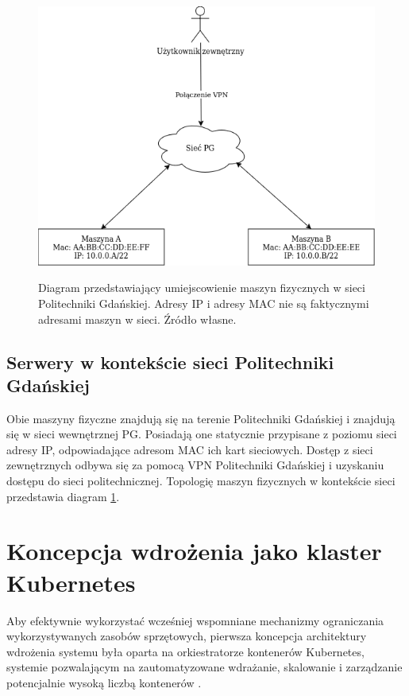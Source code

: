 \begin{figure}[!h]
	\begin{center}
		\resizebox{0.7\textwidth}{!} {
			\includegraphics{img/4/fizycznaSiec.png}
		}
		\caption[Diagram fizycznego rozmieszczenia maszyn w sieci Politechniki Gdańskiej]{Diagram przedstawiający umiejscowienie maszyn fizycznych w sieci Politechniki Gdańskiej. Adresy IP i adresy MAC nie są faktycznymi adresami maszyn w sieci. Źródło własne.}
		\label{diagramSiecFizyczna}
	\end{center}
\end{figure}

\subsection{Serwery w kontekście sieci Politechniki Gdańskiej}
Obie maszyny fizyczne znajdują się na terenie Politechniki Gdańskiej i znajdują się w sieci wewnętrznej PG. Posiadają one statycznie przypisane z poziomu sieci adresy IP, odpowiadające adresom MAC ich kart sieciowych. Dostęp z sieci zewnętrznych odbywa się za pomocą VPN Politechniki Gdańskiej i uzyskaniu dostępu do sieci politechnicznej. Topologię maszyn fizycznych w kontekście sieci przedstawia diagram \ref{diagramSiecFizyczna}.



\section{Koncepcja wdrożenia jako klaster Kubernetes}
Aby efektywnie wykorzystać wcześniej wspomniane mechanizmy ograniczania wykorzystywanych zasobów sprzętowych, pierwsza koncepcja architektury wdrożenia systemu była oparta na orkiestratorze kontenerów Kubernetes, systemie pozwalającym na zautomatyzowane wdrażanie, skalowanie i zarządzanie potencjalnie wysoką liczbą kontenerów \cite{k8sMain}.

